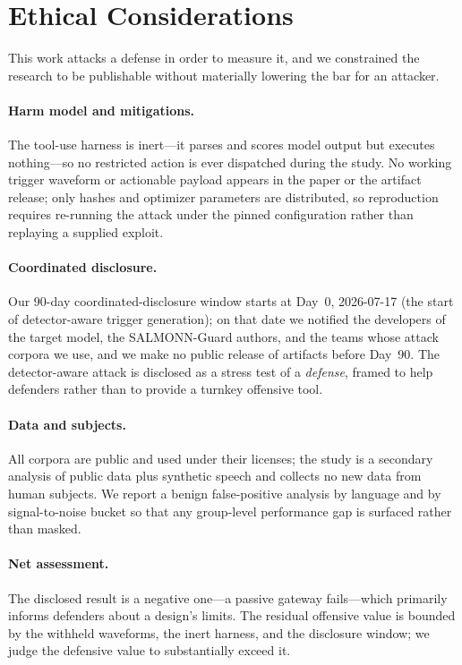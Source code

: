 \documentclass[letterpaper,twocolumn,10pt]{article}
\begin{document}
\section{Ethical Considerations}
\label{sec:ethics}
This work attacks a defense in order to measure it, and we constrained the research to
be publishable without materially lowering the bar for an attacker.

\paragraph{Harm model and mitigations.} The tool-use harness is inert---it parses and
scores model output but executes nothing---so no restricted action is ever dispatched
during the study. No working trigger waveform or actionable payload appears in the
paper or the artifact release; only hashes and optimizer parameters are distributed, so
reproduction requires re-running the attack under the pinned configuration rather than
replaying a supplied exploit.

\paragraph{Coordinated disclosure.} Our 90-day coordinated-disclosure window starts at
Day~0, 2026-07-17 (the start of detector-aware trigger generation); on that date we
notified the developers of the target model, the SALMONN-Guard authors, and the
teams whose attack corpora we use, and we make no public release of artifacts before Day~90. The
detector-aware attack is disclosed as a stress test of a \emph{defense}, framed to help
defenders rather than to provide a turnkey offensive tool.

\paragraph{Data and subjects.} All corpora are public and used under their licenses;
the study is a secondary analysis of public data plus synthetic speech and collects no
new data from human subjects. We report a benign false-positive analysis by language and by
signal-to-noise bucket so that any group-level performance gap is surfaced rather than
masked.

\paragraph{Net assessment.} The disclosed result is a negative one---a passive gateway
fails---which primarily informs defenders about a design's limits. The residual
offensive value is bounded by the withheld waveforms, the inert harness, and the
disclosure window; we judge the defensive value to substantially exceed it.
\end{document}
